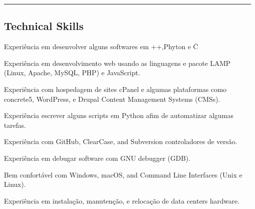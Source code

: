 \hrule
\vspace{-0.4em}
\subsection*{Technical Skills}

\begin{itemize*}
  \item Experiência em desenvolver alguns softwares em \C++,Phyton e C\.
  \item Experiência em desenvolvimento web usando as linguagens e pacote LAMP (Linux, Apache, MySQL, PHP) e JavaScript.
  \item Experiência com hospedagem de sites cPanel e algumas plataformas como concrete5, WordPress, e Drupal Content Management Systems (CMSs).
  \item Experiência escrever alguns scripts em Python afim de automatizar algumas tarefas.
  \item Experiência com GitHub, ClearCase, and Subversion controladores de versão.
  \item Experiência em debugar software com GNU debugger (GDB).
  \item Bem confortável com Windows, macOS, and Command Line Interfaces (Unix e Linux).
  \item Experiência em instalação, manutenção, e relocação de data centers hardware.
\end{itemize*}


